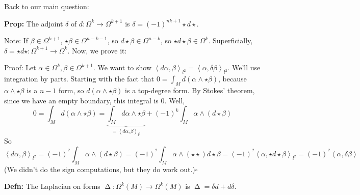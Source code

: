 \documentclass[10pt,letterpaper]{article}
\newcommand{\n}{\hfill\break}
\newcommand{\hangblock}[2]{\par\noindent\settowidth{\hangindent}{\textbf{#1: }}\textbf{#1: }\nolinebreak#2}
\newcommand{\defn}[1]{\hangblock{Defn}{#1}}
\newcommand{\prop}[1]{\hangblock{Prop}{#1}}
\newcommand{\proven}{\;$\square$\n}
\DeclareMathOperator{\Laplacian}{\Delta}
\newcommand{\iprod}[1]{\left<#1\right>}
\begin{document}
\par\noindent
Back to our main question:\n

\prop{
	The adjoint $\delta$ of $d:\Omega^{k}\to\Omega^{k+1}$ is $\delta=(-1)^{nk+1}\star{}d\star$.\n
}

\par\noindent
Note: If $\beta\in\Omega^{k+1}$, $\star\beta\in\Omega^{n-k-1}$, so $d\star\beta\in\Omega^{n-k}$, so $\star{}d\star\beta\in\Omega^{k}$. Superficially, $\delta=\star{}d\star:\Omega^{k+1}\to\Omega^{k}$. Now, we prove it:\n

\par\noindent
Proof: Let $\alpha\in\Omega^{k},\beta\in\Omega^{k+1}$. We want to show $\iprod{d\alpha,\beta}_{l^{2}}=\iprod{\alpha,\delta\beta}_{l^{2}}$. We'll use integration by parts. Starting with the fact that $0=\int_{M}d(\alpha\wedge\star\beta)$, because $\alpha\wedge\star\beta$ is a $n-1$ form, so $d(\alpha\wedge\star\beta)$ is a top-degree form. By Stokes' theorem, since we have an empty boundary, this integral is $0$. Well,
\[
	0=\int_{M}d(\alpha\wedge\star\beta)=\underbrace{\int_{M}d\alpha\wedge\star\beta}_{=\iprod{d\alpha,\beta}_{l^{2}}}+(-1)^{k}\int_{M}\alpha\wedge(d\star\beta)
\]
So
\[
	\iprod{d\alpha,\beta}_{l^{2}}=(-1)^{?}\int_{M}\alpha\wedge(d\star\beta)=(-1)^{?}\int_{M}\alpha\wedge(\star\star)d\star\beta=(-1)^{?}\iprod{\alpha,\star{}d\star\beta}_{l^{2}}=(-1)^{?}\iprod{\alpha,\delta\beta}
\]
(We didn't do the sign computations, but they do work out.)\proven

\defn{
	The Laplacian on forms $\Laplacian:\Omega^{k}(M)\to\Omega^{k}(M)$ is $\Laplacian=\delta{}d+d\delta$.\n
}
\end{document}
